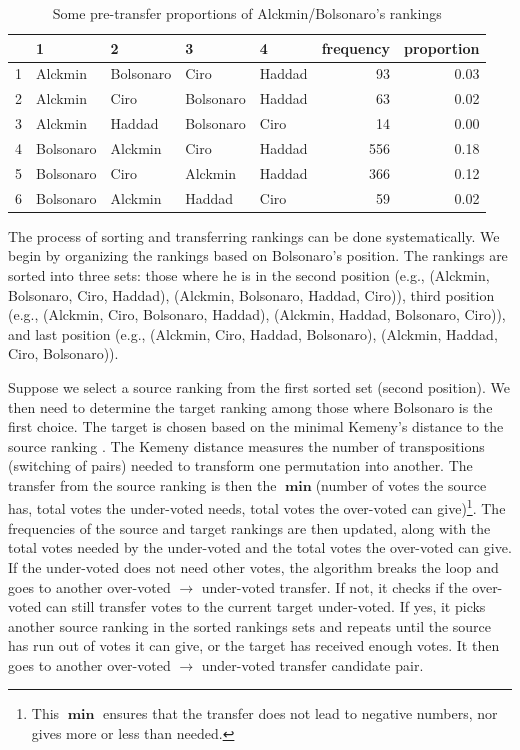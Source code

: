 \documentclass[hidelinks,11pt]{article} \usepackage[utf8]{inputenc}
\begin{document}
\begin{table}[!h] \centering %
\begin{tabular}{rllllrr} \hline & 1 & 2 & 3 & 4 & frequency & proportion \\
\hline 1 & Alckmin & Bolsonaro & Ciro & Haddad & 93 & 0.03 \\ 2 & Alckmin & Ciro
& Bolsonaro & Haddad & 63 & 0.02 \\ 3 & Alckmin & Haddad & Bolsonaro & Ciro & 14
& 0.00 \\ 4 & Bolsonaro & Alckmin & Ciro & Haddad & 556 & 0.18 \\ 5 & Bolsonaro
& Ciro & Alckmin & Haddad & 366 & 0.12 \\ 6 & Bolsonaro & Alckmin & Haddad &
Ciro & 59 & 0.02 \\ \hline
\end{tabular} %
\caption{Some pre-transfer proportions of Alckmin/Bolsonaro's rankings}
\label{tbl:overunderex}
\end{table}


The process of sorting and transferring rankings can be done systematically. We begin by organizing the rankings based on Bolsonaro's position. The rankings are sorted into three sets: those where he is in the
second position (e.g., (Alckmin, Bolsonaro, Ciro, Haddad), (Alckmin, Bolsonaro, Haddad, Ciro)), third position (e.g., (Alckmin, Ciro, Bolsonaro, Haddad), (Alckmin, Haddad, Bolsonaro, Ciro)), and last position (e.g., (Alckmin, Ciro, Haddad, Bolsonaro), (Alckmin, Haddad, Ciro, Bolsonaro)).

Suppose we select a source ranking from the first sorted set (second position). We then need to determine the target ranking among those where Bolsonaro is the first choice. The target is chosen based on the minimal Kemeny's distance to the
source ranking \parencite{nurmi2002voting}. The Kemeny distance measures the
number of transpositions (switching of pairs) needed to transform one permutation into another. The transfer from the source ranking is then the \(\operatorname{\mathbf{min}}\)(number of votes the source has, total votes the under-voted needs, total votes the over-voted can give)\footnote{This \(\operatorname{\mathbf{min}}\) ensures that the transfer does not lead to negative numbers, nor gives more or less than needed.}. The frequencies of the source and target rankings are then updated, along with the total votes needed by the under-voted and the total votes the over-voted can give. If the under-voted does not need other votes, the algorithm breaks the loop and goes to another over-voted \(\to\) under-voted transfer. If not, it checks if the over-voted can still transfer votes to the current target under-voted. If yes, it picks another source ranking in the sorted rankings sets and repeats until the source has run out of votes it can give, or the target has received enough votes. It then goes to another over-voted \(\to\) under-voted transfer candidate pair.
\end{document}
